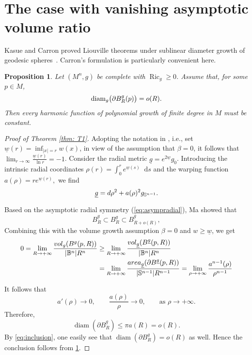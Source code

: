 \documentclass[10pt,a4paper]{amsart}
\newtheorem{proposition}[theorem]{Proposition}
\numberwithin{equation}{section}
\newcommand{\dd}{\mathop{}\!\mathrm{d}}%
\begin{document}
\section{The case with vanishing asymptotic volume ratio}

Kasue and Carron proved Liouville theorems under sublinear diameter growth of geodesic spheres~\cite{K1,K2,C}. Carron's  formulation \cite[Theorem 1.1]{C} is particularly convenient here.
\begin{proposition} \label{prop:diam}
Let $(M^n,g)$ be complete with $\operatorname{Ric}_g\ge0$.  Assume that, for some $p\in M$,
\begin{equation}\notag
 \operatorname{diam}_g\bigl(\partial B_R^g(p)\bigr)=o(R).
\end{equation}
Then every harmonic function of polynomial growth of finite degree in $M$ must be constant.
\end{proposition}

\begin{proof}[Proof of Theorem \ref{thm: T1}]
Adopting the notation in \cite{M}, i.e., set $\underline{w}(r)=\inf_{|x|=r} w(x)$, in view of the assumption that $\beta=0$, 
it follows that $\lim_{r\to \infty} \frac{\underline{w}(r)}{\ln r}=- 1$. Consider the radial metric $\underline{g}=e^{2\underline{w}} g_0$. Introducing the intrinsic radial coordinates
$\rho(r)=\int_0^r e^{\underline{w}(s)}\dd s$ and the warping function
$ a(\rho)=r e^{\underline{w}(r)},$
we find 
\begin{equation}\notag
 \underline{g}
 =d\rho^2+a(\rho)^2g_{\mathbb{S}^{n-1}}.
\end{equation}

Based on the asymptotic radial symmetry (\ref{eq:asympradial}), Ma \cite[Page 29]{M} showed that 
\begin{equation} \label{eq:inclusion}
B^{\underline{g}}_R\subset B^{g}_R\subset B^{\underline{g}}_{R+o(R)},
\end{equation}
Combining this with the volume growth assumption $\beta=0$ and $w\geq \underline{w}$, we get 
\begin{align*}
    0=\lim_{R\to+\infty}
    \frac{vol_g(B^g(p,R))}{|\mathbb{B}^n|R^n}
    &\geq \lim_{R\to+\infty}
    \frac{vol_{\underline{g}}(B^{\underline{g}}(p,R))}{|\mathbb{B}^n|R^n} \\ \notag
    &=\lim_{R\to+\infty}
    \frac{area_{\underline{g}}
    (\partial B^{\underline{g}}(p,R))}{|\mathbb{S}^{n-1}|R^{n-1}} 
    =\lim_{\rho\to+\infty}
    \frac{a^{n-1}(\rho)}{\rho^{n-1}}
\end{align*}

It follows that
\begin{equation}\label{eq:a-small}
 a'(\rho)\to0,
 \qquad
 \frac{a(\rho)}{\rho}\to0,\qquad 
 \text{as }\rho\to+\infty.
\end{equation}
Therefore, 
\[
\operatorname{diam}(\partial B^{\underline{g}}_R)\leq \pi a(R)=o(R).
\]
By \cref{eq:inclusion}, one easily see that $\operatorname{diam}(\partial B^{g}_R)=o(R)$ as well. Hence the conclusion follows from \cref{prop:diam}.
\end{proof}
\end{document}
